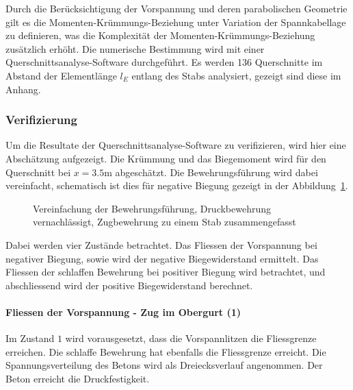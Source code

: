 \documentclass[
  11pt,
  letterpaper,
]{scrreprt}
\let\oldparagraph\paragraph
\renewcommand{\paragraph}[1]{\oldparagraph{#1}\mbox{}}
\begin{document}
Durch die Berücksichtigung der Vorspannung und deren parabolischen
Geometrie gilt es die Momenten-Krümmungs-Beziehung unter Variation der
Spannkabellage zu definieren, was die Komplexität der
Momenten-Krümmungs-Beziehung zusätzlich erhöht. Die numerische
Bestimmung wird mit einer Querschnittsanalyse-Software durchgeführt. Es
werden 136 Querschnitte im Abstand der Elementlänge \(l_E\) entlang des
Stabs analysiert, gezeigt sind diese im Anhang.

\subsubsection{Verifizierung}\label{verifizierung}

Um die Resultate der Querschnittsanalyse-Software zu verifizieren, wird
hier eine Abschätzung aufgezeigt. Die Krümmung und das Biegemoment wird
für den Querschnitt bei \(x=3.5\)m abgeschätzt. Die Bewehrungsführung
wird dabei vereinfacht, schematisch ist dies für negative Biegung
gezeigt in der Abbildung~\ref{fig-t6_qs_approx}.

\begin{figure}[H]


\caption{\label{fig-t6_qs_approx}Vereinfachung der Bewehrungsführung,
Druckbewehrung vernachlässigt, Zugbewehrung zu einem Stab
zusammengefasst}

\end{figure}%

Dabei werden vier Zustände betrachtet. Das Fliessen der Vorspannung bei
negativer Biegung, sowie wird der negative Biegewiderstand ermittelt.
Das Fliessen der schlaffen Bewehrung bei positiver Biegung wird
betrachtet, und abschliessend wird der positive Biegewiderstand
berechnet.

\paragraph{Fliessen der Vorspannung - Zug im Obergurt
(1)}\label{fliessen-der-vorspannung---zug-im-obergurt-1}

Im Zustand \(1\) wird vorausgesetzt, dass die Vorspannlitzen die
Fliessgrenze erreichen. Die schlaffe Bewehrung hat ebenfalls die
Fliessgrenze erreicht. Die Spannungsverteilung des Betons wird als
Dreiecksverlauf angenommen. Der Beton erreicht die Druckfestigkeit.
\end{document}
